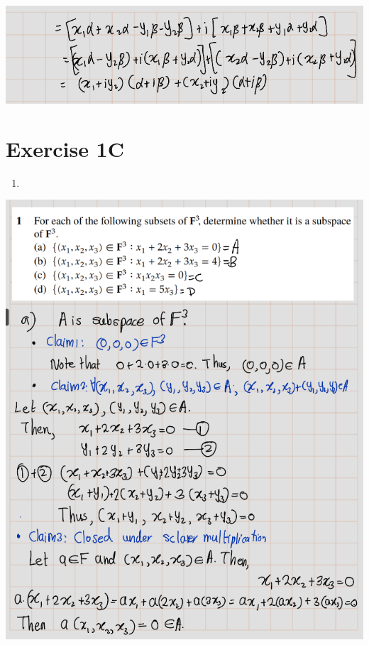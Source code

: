 \documentclass[
]{book}
\providecommand{\tightlist}{%
  \setlength{\itemsep}{0pt}\setlength{\parskip}{0pt}}
\theoremstyle{definition}
\theoremstyle{definition}
\theoremstyle{definition}
\theoremstyle{definition}
\theoremstyle{remark}
\begin{document}
\includegraphics[width=9.75in]{fig/Ex1B/Ex8-5}

\section{Exercise 1C}\label{exercise-1c}

\begin{enumerate}
\def\labelenumi{\arabic{enumi}.}
\tightlist
\item
\end{enumerate}

\includegraphics[width=9.19in]{fig/Ex1C/Ex1-1}
\end{document}
